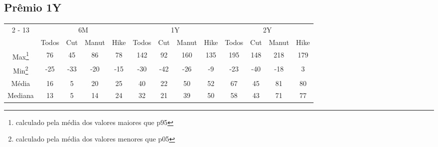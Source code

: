 \documentclass{article}%
\begin{document}
\subsection{Prêmio 1Y}%
\label{subsec:Prmio1Y}%
\begin{minipage}{\textwidth}%
\vspace*{0.4in}%
\centering%
\hspace*{-0.3in}%
%
%
\begin{tabular}{c c c c c c c c c c c c c }%
\cline{2%
-%
13}%
&\multicolumn{4}{|c|}{6M}&\multicolumn{4}{c|}{1Y}&\multicolumn{4}{c|}{2Y}\\%
&\multicolumn{1}{|c}{Todos}&\multicolumn{1}{c}{Cut}&\multicolumn{1}{c}{Manut}&\multicolumn{1}{c|}{Hike}&\multicolumn{1}{c}{Todos}&\multicolumn{1}{c}{Cut}&\multicolumn{1}{c}{Manut}&\multicolumn{1}{c|}{Hike}&\multicolumn{1}{c}{Todos}&\multicolumn{1}{c}{Cut}&\multicolumn{1}{c}{Manut}&\multicolumn{1}{c|}{Hike}\\%
\hline%
\multicolumn{1}{|c|}{Max\footnote{calculado pela média dos valores maiores que p95}}&\multicolumn{1}{c}{76}&\multicolumn{1}{c}{45}&\multicolumn{1}{c}{86}&\multicolumn{1}{c|}{78}&\multicolumn{1}{c}{142}&\multicolumn{1}{c}{92}&\multicolumn{1}{c}{160}&\multicolumn{1}{c|}{135}&\multicolumn{1}{c}{195}&\multicolumn{1}{c}{148}&\multicolumn{1}{c}{218}&\multicolumn{1}{c|}{179}\\%
\hline%
\multicolumn{1}{|c|}{Min\footnote{calculado pela média dos valores menores que p05}}&\multicolumn{1}{c}{{-}25}&\multicolumn{1}{c}{{-}33}&\multicolumn{1}{c}{{-}20}&\multicolumn{1}{c|}{{-}15}&\multicolumn{1}{c}{{-}30}&\multicolumn{1}{c}{{-}42}&\multicolumn{1}{c}{{-}26}&\multicolumn{1}{c|}{{-}9}&\multicolumn{1}{c}{{-}23}&\multicolumn{1}{c}{{-}40}&\multicolumn{1}{c}{{-}18}&\multicolumn{1}{c|}{3}\\%
\hline%
\multicolumn{1}{|c|}{Média}&\multicolumn{1}{c}{16}&\multicolumn{1}{c}{5}&\multicolumn{1}{c}{20}&\multicolumn{1}{c|}{25}&\multicolumn{1}{c}{40}&\multicolumn{1}{c}{22}&\multicolumn{1}{c}{50}&\multicolumn{1}{c|}{52}&\multicolumn{1}{c}{67}&\multicolumn{1}{c}{45}&\multicolumn{1}{c}{81}&\multicolumn{1}{c|}{80}\\%
\hline%
\multicolumn{1}{|c|}{Mediana}&\multicolumn{1}{c}{13}&\multicolumn{1}{c}{5}&\multicolumn{1}{c}{14}&\multicolumn{1}{c|}{24}&\multicolumn{1}{c}{32}&\multicolumn{1}{c}{21}&\multicolumn{1}{c}{39}&\multicolumn{1}{c|}{50}&\multicolumn{1}{c}{58}&\multicolumn{1}{c}{43}&\multicolumn{1}{c}{71}&\multicolumn{1}{c|}{77}\\%

\end{tabular}
\end{minipage}
\end{document}
